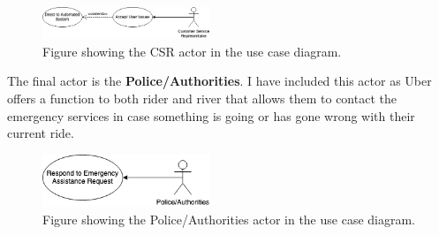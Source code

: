 \documentclass{article}
\begin{document}
      \begin{figure}[H]
        \centering
        \includegraphics[width=5cm]{assets/csr_use_case.drawio.png}
        \caption{Figure showing the CSR actor in the use case diagram.}
        \label{fig:csrUseCase}
      \end{figure}

      The final actor is the \textbf{Police/Authorities}. I have included this actor as Uber offers a function to both rider and river that allows them to contact
      the emergency services in case something is going or has gone wrong with their current ride.

      \begin{figure}[H]
        \centering
        \includegraphics[width=5cm]{assets/authorities_use_case.drawio.png}
        \caption{Figure showing the Police/Authorities actor in the use case diagram.}
        \label{fig:authoritiesUseCase}
      \end{figure}
\end{document}
